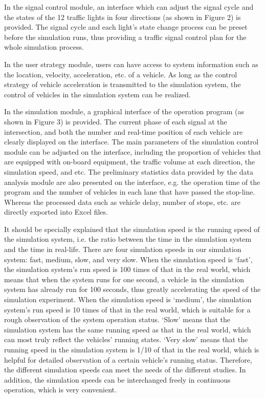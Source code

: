 In the signal control module, an interface which can adjust the signal
cycle and the states of the 12 traffic lights in four directions (as
shown in Figure 2) is provided. The signal cycle and each light's state
change process can be preset before the simulation runs, thus providing
a traffic signal control plan for the whole simulation process.

In the user strategy module, users can have access to system information
such as the location, velocity, acceleration, etc. of a vehicle. As long
as the control strategy of vehicle acceleration is transmitted to the
simulation system, the control of vehicles in the simulation system can
be realized.

In the simulation module, a graphical interface of the operation program
(as shown in Figure 3) is provided. The current phase of each signal at
the intersection, and both the number and real-time position of each
vehicle are clearly displayed on the interface. The main parameters of
the simulation control module can be adjusted on the interface,
including the proportion of vehicles that are equipped with on-board
equipment, the traffic volume at each direction, the simulation speed,
and etc. The preliminary statistics data provided by the data analysis
module are also presented on the interface, e.g. the operation time of
the program and the number of vehicles in each lane that have passed the
stop-line. Whereas the processed data such as vehicle delay, number of
stops, etc. are directly exported into Excel files.

It should be specially explained that the simulation speed is the
running speed of the simulation system, i.e. the ratio between the time
in the simulation system and the time in real-life. There are four
simulation speeds in our simulation system: fast, medium, slow, and very
slow. When the simulation speed is `fast', the simulation system's run
speed is 100 times of that in the real world, which means that when the
system runs for one second, a vehicle in the simulation system has
already run for 100 seconds, thus greatly accelerating the speed of the
simulation experiment. When the simulation speed is `medium', the
simulation system's run speed is 10 times of that in the real world,
which is suitable for a rough observation of the system operation
status. `Slow' means that the simulation system has the same running
speed as that in the real world, which can most truly reflect the
vehicles' running states. `Very slow' means that the running speed in
the simulation system is 1/10 of that in the real world, which is
helpful for detailed observation of a certain vehicle's running status.
Therefore, the different simulation speeds can meet the needs of the
different studies. In addition, the simulation speeds can be
interchanged freely in continuous operation, which is very convenient.

